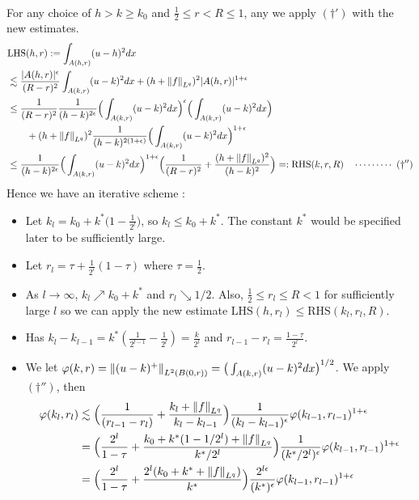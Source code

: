 \documentclass[12pt,a4paper]{article}
\newenvironment{proof}
{\begin{changemargin}{0.5cm}{0.5cm} 
	}%
	{\end{changemargin}
}
\newenvironment{p}
{\begin{proof} 
	}%
	{\end{proof}
}
\begin{document}
\begin{p}
\begin{align*}
\end{align*}
For any choice of $h> k \geq k_0$ and $\frac{1}{2} \leq r < R \leq 1$, any we apply $(\dagger')$ with the new estimates.
\begin{align*}
&\text{LHS}(h,r) := \int_{A(h,r)} (u-h)^2 dx \\
&\lesssim \frac{|A(h,r)|^{\epsilon}}{(R-r)^2} \int_{A(k,r)} (u-k)^2 dx + (h + \snorms{f}{L^q})^2 |A(h,r)|^{1+ \epsilon} \\
&\leq \frac{1}{(R-r)^2} \frac{1}{(h-k)^{2\epsilon}}\Big( \int_{A(k,r) } (u-k)^2 dx \Big)^{\epsilon} \Big( \int_{A(k,r)} (u-k)^2 dx \Big) \\
& \quad \quad + (h + \snorms{f}{L^q})^2 \frac{1}{(h-k)^{2(1+\epsilon)}} \Big( \int_{A(k,r)} (u-k)^2 dx \Big)^{1+\epsilon} \\
& \leq \frac{1}{(h-k)^{2\epsilon}} \Big( \int_{A(k,r)} (u-k)^2 dx \Big)^{1+\epsilon} \Big( \frac{1}{(R-r)^2} + \frac{(h+ \snorms{f}{L^q})^2}{(h-k)^2} \Big) =: \text{RHS}(k,r,R) \call{\dagger''}
\end{align*}
Hence we have an iterative scheme :
\begin{itemize}
\item Let $k_l = k_0 + k^* \big(1- \frac{1}{2^l}\big)$, so $k_l \leq k_0 + k^*$. The constant $k^*$ would be specified later to be sufficiently large.
\item Let $r_l = \tau + \frac{1}{2^l}(1-\tau)$ where $\tau = \frac{1}{2}$.
\item As $l\rightarrow \infty$, $k_l \nearrow k_0 + k^*$ and $r_l \searrow 1/2$. Also, $\frac{1}{2} \leq r_l \leq R < 1$ for sufficiently large $l$ so we can apply the new estimate $\text{LHS}(h,r_l) \leq \text{RHS}(k_l,r_l,R)$.
\item Has $k_l - k_{l-1} = k^* (\frac{1}{2^{l-1}} - \frac{1}{2^l}) = \frac{k}{2^l}$ and $r_{l-1} - r_l = \frac{1-\tau}{2^l}$.
\item We let $\varphi(k,r) = \snorms{(u-k)^+}{L^2(B(0,r))} = \big( \int_{A(k,r)}(u-k)^2 dx \big)^{1/2}$. We apply $(\dagger'')$, then
\begin{align*}
\varphi(k_l, r_l) &\lesssim \Big( \frac{1}{(r_{l-1} - r_l)} + \frac{k_l + \snorms{f}{L^q}}{k_l - k_{l-1}} \Big) \frac{1}{(k_l - k_{l-1})^{\epsilon}} \varphi(k_{l-1}, r_{l-1})^{1+\epsilon} \\
&= \Big( \frac{2^l}{1-\tau} + \frac{k_0 + k^* (1- 1/2^l) + \snorms{f}{L^q}}{k^* / 2^l} \Big) \frac{1}{(k^*/2^l)^{\epsilon}} \varphi(k_{l-1}, r_{l-1})^{1+\epsilon} \\
&= \Big(\frac{2^l}{1- \tau} + \frac{2^l (k_0 + k^* + \snorms{f}{L^q})}{k^*}\Big) \frac{2^{l\epsilon}}{(k^*)^{\epsilon}} \varphi(k_{l-1} , r_{l-1})^{1+\epsilon} \\

\end{align*}
\end{itemize}
\end{p}
\end{document}
